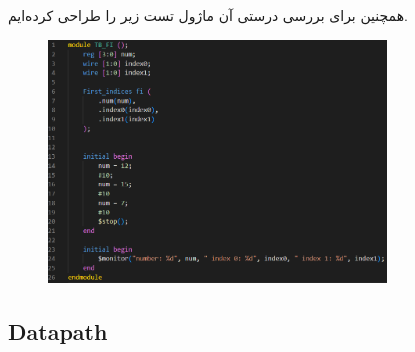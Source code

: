 \documentclass{article}
\begin{document}
همچنین برای بررسی درستی آن ماژول تست زیر را طراحی کرده‌ایم.

\begin{figure}[H]
    \centering
    \includegraphics[width=0.8\textwidth]{TB_FI.png}
\end{figure}
\newpage
\subsection{Datapath}
\end{document}
